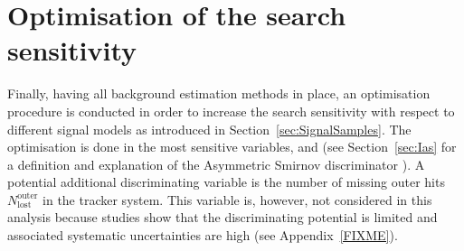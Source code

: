 \FloatBarrier
\chapter{Optimisation of the search sensitivity}
\label{sec:Optimisation}
Finally, having all background estimation methods in place, an optimisation procedure is conducted in order to increase the search sensitivity with respect to different signal models as introduced in Section~\ref{sec:SignalSamples}.
The optimisation is done in the most sensitive variables, \pt and \ias (see Section~\ref{sec:Ias} for a definition and explanation of the Asymmetric Smirnov discriminator \ias).
A potential additional discriminating variable is the number of missing outer hits $N_{\text{lost}}^{\text{outer}}$ in the tracker system. 
This variable is, however, not considered in this analysis because studies show that the discriminating potential is limited and associated systematic uncertainties are high (see Appendix~\ref{FIXME}).

